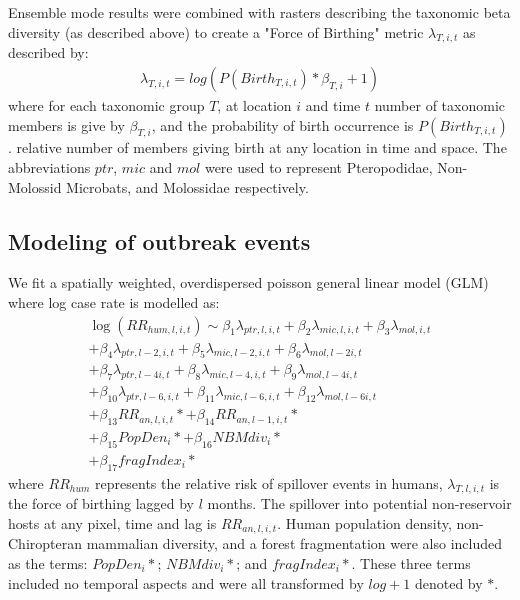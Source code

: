 \documentclass[9pt,twoside,lineno]{pnas-new}
\begin{document}
Ensemble mode results were combined with rasters describing the taxonomic beta diversity (as described above) to create a "Force of Birthing" metric $\lambda_{T,i,t}$ as described by:
 \begin{equation}
    \begin{gathered}
 	    \lambda_{T,i,t} = log(P(Birth_{T,i,t})*\beta_{T,i} +1)
    \end{gathered}
 \end{equation}
where for each taxonomic group $T$, at location $i$ and time $t$ number of taxonomic members is give by $\beta_{T,i}$, and the probability of birth occurrence is $P(Birth_{T,i,t})$.
relative number of members giving birth at any location in time and space. The abbreviations $ptr$, $mic$ and $mol$ were used to represent Pteropodidae, Non-Molossid Microbats, and Molossidae respectively.  

\subsection*{Modeling of outbreak events}
\label{spatGLM}
We fit a spatially weighted, overdispersed poisson general linear model (GLM) where log case rate is modelled as:
\begin{equation}
\begin{gathered}
\log(RR_{hum, l, i, t}) \sim \beta_1 \lambda_{ptr, l, i, t} + \beta_2 \lambda_{mic, l, i, t} + \beta_3 \lambda_{mol, i, t} \\
+ \beta_4 \lambda_{ptr, l-2, i, t} + \beta_5 \lambda_{mic, l-2, i, t} + \beta_6 \lambda_{mol, l-2 i, t} \\
+ \beta_7 \lambda_{ptr, l-4 i, t} + \beta_8 \lambda_{mic, l-4, i, t} + \beta_9 \lambda_{mol, l-4 i, t} \\
+ \beta_{10} \lambda_{ptr, l-6, i, t} + \beta_{11} \lambda_{mic, l-6, i, t} + \beta_{12} \lambda_{mol, l-6 i, t} \\
+ \beta_{13} RR_{an, l, i, t}* + \beta_{14} RR_{an, l-1, i, t}*  \\
+ \beta_{15} PopDen_{i}* + \beta_{16} NBM div_{i}* \\
+ \beta_{17} fragIndex_{i}* 
\end{gathered}
\end{equation}
where $RR_{hum}$ represents the relative risk of spillover events in humans, $\lambda_{T, l, i, t}$ is the force of birthing lagged by $l$ months.
The spillover into potential non-reservoir hosts at any pixel, time and lag is $RR_{an, l , i, t}$. Human population density, non-Chiropteran mammalian diversity, and a forest fragmentation were also included as the terms: $PopDen_{i}*$; $NBM div_{i}*$; and $fragIndex_{i}*$.
These three terms included no temporal aspects and were all transformed by $log +1$ denoted by $*$. \par 
\end{document}

